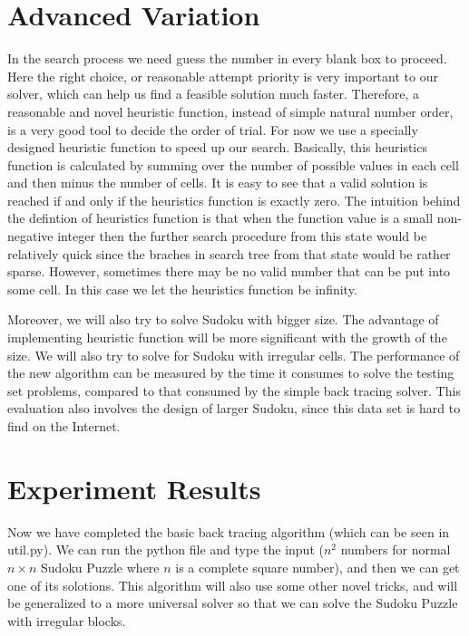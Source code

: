 \documentclass[12pt]{article}
\begin{document}
\begin{spacing}{1.1}
\section{Advanced Variation}
In the search process we need guess the number in every blank box to proceed. Here the right choice, or reasonable attempt priority is very important to our solver, which can help us find a feasible solution much faster. Therefore, a reasonable and novel heuristic function, instead of simple natural number order, is a very good tool to decide the order of trial. For now we use a specially designed heuristic function to speed up our search. Basically, this heuristics function is calculated by summing over the number of possible values in each cell and then minus the number of cells. It is easy to see that a valid solution is reached if and only if the heuristics function is exactly zero.  The intuition behind the defintion of heuristics function is that when the function value is a small non-negative integer then the further search procedure from this state would be relatively quick since the braches in search tree from that state would be rather sparse. However, sometimes there may be no valid number that can be put into some cell. In this case we let the heuristics function be infinity.

Moreover, we will also try to solve Sudoku with bigger size. The advantage of implementing heuristic function will be more significant with the growth of the size. We will also try to solve for Sudoku with irregular cells. The performance of the new algorithm can be measured by the time it consumes to solve the testing set problems, compared to that consumed by the simple back tracing solver. This evaluation also involves the design of larger Sudoku, since this data set is hard to find on the Internet.

\section{Experiment Results}
Now we have completed the basic back tracing algorithm (which can be seen in util.py). We can run the python file and type the input ($n^2$ numbers for normal $n\times n$ Sudoku Puzzle where $n$ is a complete square number), and then we can get one of its solotions. This algorithm will also use some other novel tricks, and will be generalized to a more universal solver so that we can solve the Sudoku Puzzle with irregular blocks.


\end{spacing}
\end{document}
